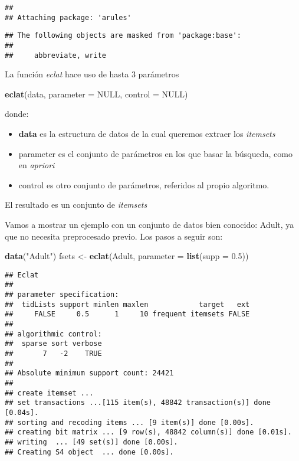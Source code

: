 \documentclass[]{article}
\newenvironment{Shaded}{\begin{snugshade}}{\end{snugshade}}
\newcommand{\KeywordTok}[1]{\textcolor[rgb]{0.13,0.29,0.53}{\textbf{#1}}}
\newcommand{\DataTypeTok}[1]{\textcolor[rgb]{0.13,0.29,0.53}{#1}}
\newcommand{\FloatTok}[1]{\textcolor[rgb]{0.00,0.00,0.81}{#1}}
\newcommand{\StringTok}[1]{\textcolor[rgb]{0.31,0.60,0.02}{#1}}
\newcommand{\OtherTok}[1]{\textcolor[rgb]{0.56,0.35,0.01}{#1}}
\newcommand{\NormalTok}[1]{#1}
\providecommand{\tightlist}{%
  \setlength{\itemsep}{0pt}\setlength{\parskip}{0pt}}
\begin{document}
\begin{verbatim}
## 
## Attaching package: 'arules'
\end{verbatim}

\begin{verbatim}
## The following objects are masked from 'package:base':
## 
##     abbreviate, write
\end{verbatim}

La función \emph{eclat} hace uso de hasta 3 parámetros

\begin{Shaded}
\begin{Highlighting}[]
\KeywordTok{eclat}\NormalTok{(data, }\DataTypeTok{parameter =} \OtherTok{NULL}\NormalTok{, }\DataTypeTok{control =} \OtherTok{NULL}\NormalTok{)}
\end{Highlighting}
\end{Shaded}

donde:

\begin{itemize}
\tightlist
\item
  \textbf{data} es la estructura de datos de la cual queremos extraer
  los \emph{itemsets}
\item
  parameter es el conjunto de parámetros en los que basar la búsqueda,
  como en \emph{apriori}
\item
  control es otro conjunto de parámetros, referidos al propio algoritmo.
\end{itemize}

El resultado es un conjunto de \emph{itemsets}

Vamos a mostrar un ejemplo con un conjunto de datos bien conocido:
Adult, ya que no necesita preprocesado previo. Los pasos a seguir son:

\begin{Shaded}
\begin{Highlighting}[]
\KeywordTok{data}\NormalTok{(}\StringTok{"Adult"}\NormalTok{) }
\NormalTok{fsets <-}\StringTok{ }\KeywordTok{eclat}\NormalTok{(Adult, }\DataTypeTok{parameter =} \KeywordTok{list}\NormalTok{(}\DataTypeTok{supp =} \FloatTok{0.5}\NormalTok{))}
\end{Highlighting}
\end{Shaded}

\begin{verbatim}
## Eclat
## 
## parameter specification:
##  tidLists support minlen maxlen            target   ext
##     FALSE     0.5      1     10 frequent itemsets FALSE
## 
## algorithmic control:
##  sparse sort verbose
##       7   -2    TRUE
## 
## Absolute minimum support count: 24421 
## 
## create itemset ... 
## set transactions ...[115 item(s), 48842 transaction(s)] done [0.04s].
## sorting and recoding items ... [9 item(s)] done [0.00s].
## creating bit matrix ... [9 row(s), 48842 column(s)] done [0.01s].
## writing  ... [49 set(s)] done [0.00s].
## Creating S4 object  ... done [0.00s].
\end{verbatim}
\end{document}
